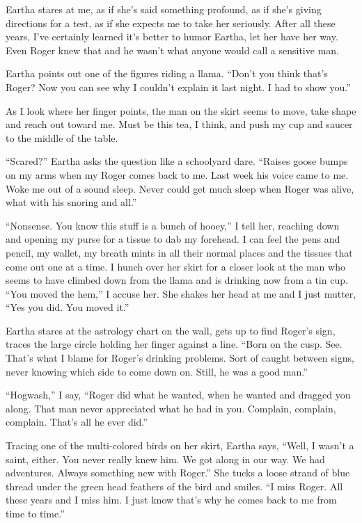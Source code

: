 \documentclass[twoside,10pt]{book}
\begin{document}
Eartha stares at me, as if she's said something profound, as if she's
giving directions for a test, as if she expects me to take her
seriously. After all these years, I've certainly learned it's better to
humor Eartha, let her have her way. Even Roger knew that and he wasn't
what anyone would call a sensitive man.

Eartha points out one of the figures riding a llama. ``Don't you think
that's Roger? Now you can see why I couldn't explain it last night. I
had to show you.''

As I look where her finger points, the man on the skirt seems to move,
take shape and reach out toward me. Must be this tea, I think, and push
my cup and saucer to the middle of the table.

``Scared?'' Eartha asks the question like a schoolyard dare. ``Raises
goose bumps on my arms when my Roger comes back to me. Last week his
voice came to me. Woke me out of a sound sleep. Never could get much
sleep when Roger was alive, what with his snoring and all.''

``Nonsense. You know this stuff is a bunch of hooey,'' I tell her,
reaching down and opening my purse for a tissue to dab my forehead. I
can feel the pens and pencil, my wallet, my breath mints in all their
normal places and the tissues that come out one at a time. I hunch over
her skirt for a closer look at the man who seems to have climbed down
from the llama and is drinking now from a tin cup. ``You moved the
hem,'' I accuse her. She shakes her head at me and I just mutter, ``Yes
you did. You moved it.''

Eartha stares at the astrology chart on the wall, gets up to find
Roger's sign, traces the large circle holding her finger against a line.
``Born on the cusp. See. That's what I blame for Roger's drink­ing
problems. Sort of caught between signs, never knowing which side to come
down on. Still, he was a good man.''

``Hogwash,'' I say, ``Roger did what he wanted, when he wanted and
dragged you along. That man never appreciated what he had in you.
Complain, complain, complain. That's all he ever did.''

Tracing one of the multi-colored birds on her skirt, Eartha says,
``Well, I wasn't a saint, either. You never really knew him. We got
along in our way. We had adventures. Always something new with Roger.''
She tucks a loose strand of blue thread under the green head feathers of
the bird and smiles. ``I miss Roger. All these years and I miss him. I
just know that's why he comes back to me from time to time.''
\end{document}
